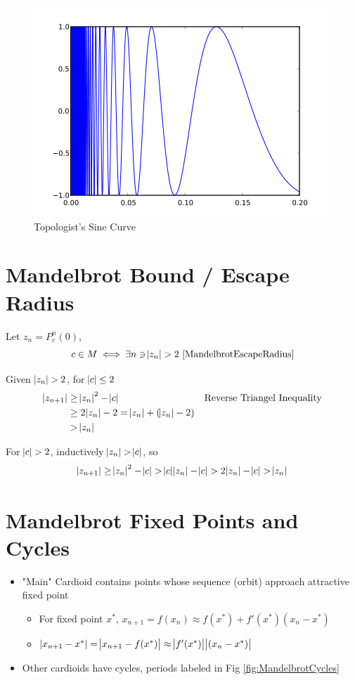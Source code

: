 \documentclass{article}
\begin{document}
\begin{figure}[!htbp]
    \centering
    \includegraphics[width=.4\linewidth]{420px-Topologist_sine_curve.png}
    \caption{Topologist's Sine Curve \cite{TopSineCurve}}%
\end{figure}



\section{Mandelbrot Bound / Escape Radius}

Let $z_n = P_c^n(0)$,
\[ c \in M \iff \exists n \ni \abs{z_n} > 2\ \text{\cite{MandelbrotEscapeRadius}}\]

Given $\abs{z_n} > 2$, for $\abs{c} \leq 2$
\begin{align*}
    \abs{z_{n+1}} &\geq \abs{z_n}^2 - \abs{c} &&\text{Reverse Triangel Inequality} \\
    &\geq 2\abs{z_n} - 2 = \abs{z_n} + (\abs{z_n} - 2) \\
    &> \abs{z_n}
\end{align*}

For $\abs{c} > 2$, inductively $\abs{z_n} > \abs{c}$, so
\[ \abs{z_{n+1}} \geq \abs{z_n}^2 - \abs{c} > \abs{c}\abs{z_n} - \abs{c} > 2\abs{z_n} - \abs{c} > \abs{z_n} \] 


\section{Mandelbrot Fixed Points and Cycles}

\begin{itemize}
    \item "Main" Cardioid contains points whose sequence (orbit) approach attractive fixed point
    \begin{itemize}
        \item For fixed point $x^*$, $x_{n+1} = f(x_n) \approx f(x^*) + f'(x^*)(x_n - x^*)$
        \item $\abs{x_{n + 1} - x^*} = \abs{x_{n+1} - f(x^*)} \approx \abs{f'(x^*)}\abs{(x_n - x^*)}$
    \end{itemize}
    \item Other cardioids have cycles, periods labeled in Fig \ref{fig:MandelbrotCycles}
\end{itemize}
\end{document}
